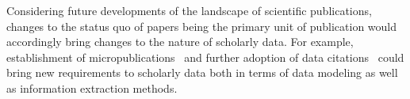 Considering future developments of the landscape of scientific publications, changes to the status quo of papers being the primary unit of publication would accordingly bring changes to the nature of scholarly data. For example, establishment of micropublications~\cite{Raciti2018} and further adoption of data citations~\cite{Kratz2015} could bring new requirements to 
scholarly data both in terms of data modeling as well as information extraction methods.
